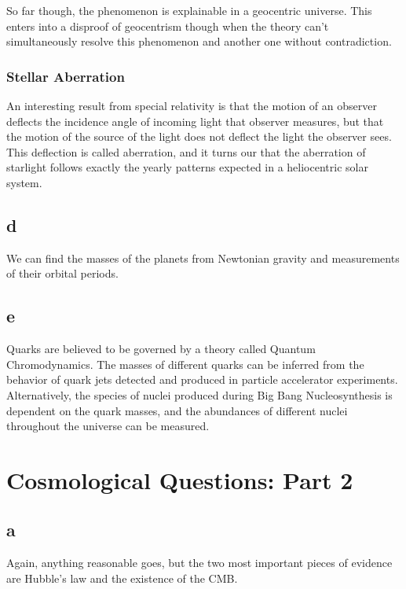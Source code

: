 \documentclass[12pt]{article}
\begin{document}
So far though, the phenomenon is explainable in a geocentric universe. This enters into a disproof of geocentrism though when the theory can't simultaneously resolve this phenomenon and another one without contradiction.

\subsubsection*{Stellar Aberration}

An interesting result from special relativity is that the motion of an observer deflects the incidence angle of incoming light that observer measures, but that the motion of the source of the light does not deflect the light the observer sees. This deflection is called aberration, and it turns our that the aberration of starlight follows exactly the yearly patterns expected in a heliocentric solar system.

\subsection*{d}

We can find the masses of the planets from Newtonian gravity and measurements of their orbital periods.

\subsection*{e}

Quarks are believed to be governed by a theory called Quantum Chromodynamics. The masses of different quarks can be inferred from the behavior of quark jets detected and produced in particle accelerator experiments. Alternatively, the species of nuclei produced during Big Bang Nucleosynthesis is dependent on the quark masses, and the abundances of different nuclei throughout the universe can be measured.

\section{Cosmological Questions: Part 2}

\subsection*{a}

Again, anything reasonable goes, but the two most important pieces of evidence are Hubble's law and the existence of the CMB.
\end{document}
